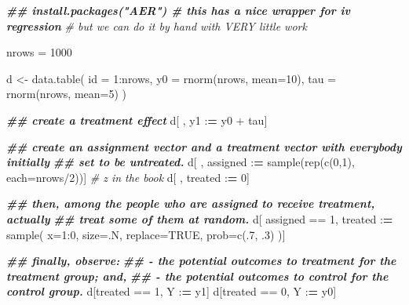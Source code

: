 \documentclass[
]{article}
\newenvironment{Shaded}{\begin{snugshade}}{\end{snugshade}}
\newcommand{\AttributeTok}[1]{\textcolor[rgb]{0.77,0.63,0.00}{#1}}
\newcommand{\CommentTok}[1]{\textcolor[rgb]{0.56,0.35,0.01}{\textit{#1}}}
\newcommand{\ConstantTok}[1]{\textcolor[rgb]{0.00,0.00,0.00}{#1}}
\newcommand{\DecValTok}[1]{\textcolor[rgb]{0.00,0.00,0.81}{#1}}
\newcommand{\DocumentationTok}[1]{\textcolor[rgb]{0.56,0.35,0.01}{\textbf{\textit{#1}}}}
\newcommand{\ErrorTok}[1]{\textcolor[rgb]{0.64,0.00,0.00}{\textbf{#1}}}
\newcommand{\FunctionTok}[1]{\textcolor[rgb]{0.00,0.00,0.00}{#1}}
\newcommand{\NormalTok}[1]{#1}
\newcommand{\OtherTok}[1]{\textcolor[rgb]{0.56,0.35,0.01}{#1}}
\newcommand{\SpecialCharTok}[1]{\textcolor[rgb]{0.00,0.00,0.00}{#1}}
\begin{document}
\begin{Shaded}
\begin{Highlighting}[]
\DocumentationTok{\#\# install.packages("AER")      \# this has a nice wrapper for iv regression}
                                \CommentTok{\# but we can do it by hand with VERY little work }

\NormalTok{nrows }\OtherTok{=} \DecValTok{1000}

\NormalTok{d }\OtherTok{\textless{}{-}} \FunctionTok{data.table}\NormalTok{(}
  \AttributeTok{id  =} \DecValTok{1}\SpecialCharTok{:}\NormalTok{nrows, }
  \AttributeTok{y0  =} \FunctionTok{rnorm}\NormalTok{(nrows, }\AttributeTok{mean=}\DecValTok{10}\NormalTok{), }
  \AttributeTok{tau =} \FunctionTok{rnorm}\NormalTok{(nrows, }\AttributeTok{mean=}\DecValTok{5}\NormalTok{)}
\NormalTok{)}

\DocumentationTok{\#\# create a treatment effect}
\NormalTok{d[ , y1 }\SpecialCharTok{:}\ErrorTok{=}\NormalTok{ y0 }\SpecialCharTok{+}\NormalTok{ tau]}

\DocumentationTok{\#\# create an assignment vector and a treatment vector with everybody initially}
\DocumentationTok{\#\# set to be untreated. }
\NormalTok{d[ , assigned }\SpecialCharTok{:}\ErrorTok{=} \FunctionTok{sample}\NormalTok{(}\FunctionTok{rep}\NormalTok{(}\FunctionTok{c}\NormalTok{(}\DecValTok{0}\NormalTok{,}\DecValTok{1}\NormalTok{), }\AttributeTok{each=}\NormalTok{nrows}\SpecialCharTok{/}\DecValTok{2}\NormalTok{))] }\CommentTok{\# z in the book}
\NormalTok{d[ , treated }\SpecialCharTok{:}\ErrorTok{=} \DecValTok{0}\NormalTok{] }

\DocumentationTok{\#\# then, among the people who are assigned to receive treatment, actually }
\DocumentationTok{\#\# treat some of them at random. }
\NormalTok{d[}
\NormalTok{  assigned }\SpecialCharTok{==} \DecValTok{1}\NormalTok{, }
\NormalTok{  treated  }\SpecialCharTok{:}\ErrorTok{=} \FunctionTok{sample}\NormalTok{(}
    \AttributeTok{x=}\DecValTok{1}\SpecialCharTok{:}\DecValTok{0}\NormalTok{, }\AttributeTok{size=}\NormalTok{.N, }\AttributeTok{replace=}\ConstantTok{TRUE}\NormalTok{, }\AttributeTok{prob=}\FunctionTok{c}\NormalTok{(.}\DecValTok{7}\NormalTok{, .}\DecValTok{3}\NormalTok{)}
\NormalTok{    )]}

\DocumentationTok{\#\# finally, observe: }
\DocumentationTok{\#\#   {-} the potential outcomes to treatment for the treatment group; and, }
\DocumentationTok{\#\#   {-} the potential outcomes to control for the control group. }
\NormalTok{d[treated }\SpecialCharTok{==} \DecValTok{1}\NormalTok{, Y }\SpecialCharTok{:}\ErrorTok{=}\NormalTok{ y1]}
\NormalTok{d[treated }\SpecialCharTok{==} \DecValTok{0}\NormalTok{, Y }\SpecialCharTok{:}\ErrorTok{=}\NormalTok{ y0]}
\end{Highlighting}
\end{Shaded}
\end{document}
